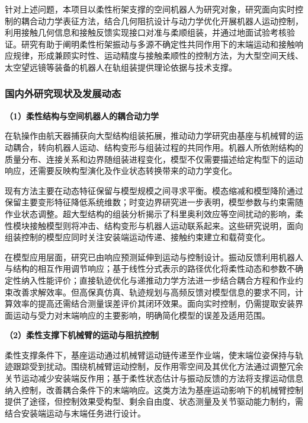 \documentclass[UTF8,a4paper,zihao=-4,fontset=fandol]{ctexart}
\newcommand{\topic}[1]{\par\Needspace{4\baselineskip}\addvspace{0.5em}\noindent\textbf{#1}\par\nobreak}
\begin{document}
针对上述问题，本项目以柔性桁架支撑的空间机器人为研究对象，研究面向实时控制的耦合动力学表征方法，结合几何阻抗设计与动力学优化开展机器人运动控制，利用接触几何信息和接触反馈实现接口对准与柔顺组装，并通过地面试验考核验证。研究有助于阐明柔性桁架振动与多源不确定性共同作用下的末端运动和接触响应规律，形成兼顾实时性、运动精度与接触柔顺性的控制方法，为大型空间天线、太空望远镜等装备的机器人在轨组装提供理论依据与技术支撑。

\subsubsection{国内外研究现状及发展动态}

\topic{（1）柔性结构与空间机器人的耦合动力学}

在轨操作由航天器捕获向大型结构组装拓展，推动动力学研究由基座与机械臂的运动耦合，转向机器人运动、结构变形与组装过程的共同作用\cite{hu2025,wu2024,papadopoulos2021}。机器人所依附结构的质量分布、连接关系和边界随组装进程变化，模型不仅需要描述给定构型下的运动响应，还需要反映构型演化及作业状态转换带来的动力学变化。

现有方法主要在动态特征保留与模型规模之间寻求平衡。模态缩减和模型降阶通过保留主要变形特征降低系统维数\cite{sonneville2021,min2026}；时变边界研究进一步表明，模型参数与约束需随作业状态调整\cite{ni2024}。超大型结构的组装分析揭示了科里奥利效应等空间扰动的影响\cite{yang2023}，柔性模块接触模型则将冲击、结构变形与机器人运动联系起来\cite{wucontact2026}。这些研究说明，面向组装控制的模型应同时关注安装端运动传递、接触约束建立和载荷变化。

在模型应用层面，研究已由响应预测延伸到运动与控制设计。振动反馈利用机器人与结构的相互作用调节响应\cite{swei2020}；基于线性分式表示的路径优化将柔性动态和参数不确定性纳入性能评价\cite{rodrigues2025}；直接轨迹优化与递推动力学方法进一步结合耦合方程和作业约束改善求解效率\cite{liu2026,gong2026}。但高保真仿真、轨迹规划与高频反馈对模型信息的要求不同，计算效率的提高还需结合测量误差评价其闭环效果。面向实时控制，仍需提取安装界面运动与受力对末端响应的主要影响，明确简化模型的误差及适用范围。

\topic{（2）柔性支撑下机械臂的运动与阻抗控制}

柔性支撑条件下，基座运动通过机械臂运动链传递至作业端，使末端位姿保持与轨迹跟踪受到扰动。围绕机械臂运动控制，反作用零空间及其优化方法通过调整冗余关节运动减少安装端反作用\cite{nenchev1999,yin2023}；基于柔性状态估计与振动反馈的方法将支撑运动信息纳入控制，改善耦合条件下的末端响应\cite{patel2024,zhou2025}。这类方法为基座运动影响下的机械臂控制提供了途径，但控制效果受构型、剩余自由度、状态测量及关节驱动能力制约，需结合安装端运动与末端任务进行设计。
\end{document}
